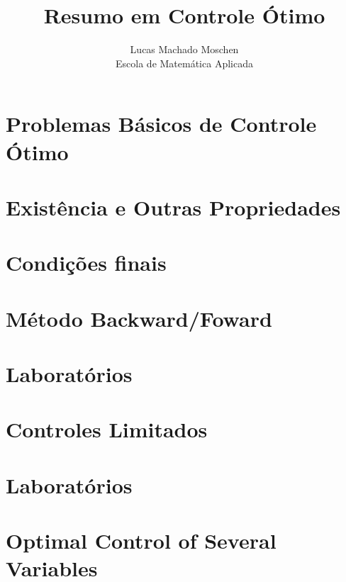 \documentclass[12pt]{article}
\begin{document}
\newcommand{\e}{\epsilon}
\newcommand{\la}{\lambda}

\title{Resumo em Controle Ótimo}
\author{Lucas Machado Moschen\\ 
Escola de Matemática Aplicada}

\maketitle

\doublespacing
\section{Problemas Básicos de Controle Ótimo}


\section{Existência e Outras Propriedades}


\section{Condições finais}


\section{Método Backward/Foward}


\section{Laboratórios}


\section{Controles Limitados}


\section{Laboratórios}


\section{Optimal Control of Several Variables}

\end{document}
